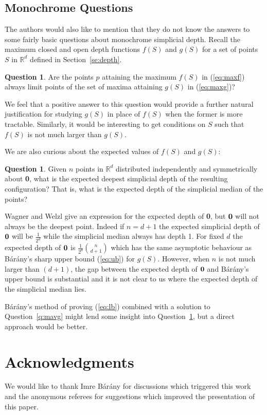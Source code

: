 \documentclass[epsbox,12pt,reqno]{amsart}
\theoremstyle{definition}
\newtheorem{question}[theorem]{Question}
\theoremstyle{remark}
\def\bara{B\'ar\'any}
\def\R{\mathbb{R}}
\def\zero{{\bf 0}}
\begin{document}
\subsection{Monochrome Questions}
The authors would also like to mention that they do not know
the answers to some fairly basic questions about monochrome 
simplicial depth.
Recall the maximum closed and open depth functions $f(S)$ and $g(S)$ 
for a set of points $S$ in $\R^d$  defined in Section~\ref{se:depth}.
\begin{question}\label{q:limits}
Are the points $p$ attaining the maximum $f(S)$ in (\ref{eq:maxf})
always limit points of the set of maxima attaining $g(S)$
in (\ref{eq:maxg})?
\end{question}
We feel that a positive answer to this question would provide
a further natural justification for studying $g(S)$ in place of $f(S)$
when the former is more tractable.  Similarly, it would be interesting
to get conditions on $S$ such that $f(S)$ is not much larger
than $g(S)$.

We are also curious about the expected values of $f(S)$ and $g(S)$:
\begin{question}\label{q:mono}
Given $n$ points in $\R^d$ distributed independently and symmetrically
about \zero, what is the expected deepest simplicial depth of the
resulting configuration?  That is, what is the expected
depth of the simplicial median of the points?
\end{question}
Wagner and Welzl \cite{WW01} give an expression for the 
expected depth of \zero, but $\zero$ will not always
be the deepest point. 
Indeed if $n=d+1$ the expected simplicial depth of $\zero$ will be 
$\frac{1}{2^d}$ while the simplicial median always has depth 1.
For fixed $d$ the expected depth of $\zero$ is
$\frac{1}{2^d}\binom{n}{d+1}$ which has the same asymptotic behaviour as
\bara's sharp upper bound (\ref{eq:ub}) for $g(S)$.
However, when $n$ is not much larger than $(d+1)$, the gap between 
the expected depth of $\zero$ and \bara's upper bound is substantial and it is
not clear to us where the expected depth of the simplicial median lies.

\bara's method of proving 
(\ref{eq:lb}) combined with a solution to Question~\ref{q:mavg}
might lend some insight into Question~\ref{q:mono}, but a direct
approach would be better.

%
%
\section{Acknowledgments}
We would like to thank {\sc Imre B\'ar\'any} for discussions
which triggered this work and the anonymous referees for
suggestions which improved the presentation of this paper. 





\end{document}
